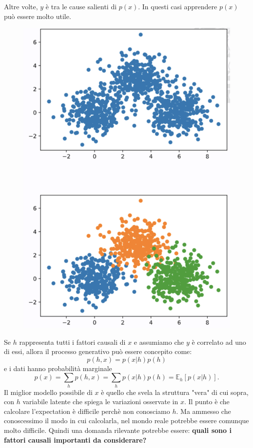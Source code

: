 Altre volte, $y$ è tra le cause salienti di $p(x)$. In questi casi apprendere $p(x)$ può essere molto utile.
\begin{figure}[!h]
  \includegraphics[scale=.3]{images/representation_learning/success.png}
  \centering
\end{figure}
\newpage
Se $h$ rappresenta tutti i fattori causali di $x$ e assumiamo che $y$ è correlato ad uno di essi, allora il
processo generativo può essere concepito come:
\begin{equation}
  p(h,x)=p(x|h)p(h)
\end{equation}
e i dati hanno probabilità marginale
\begin{equation}
  p(x)=\sum_hp(h,x)=\sum_hp(x|h)p(h)=\mathbb{E}_h[p(x|h)].
\end{equation}
Il miglior modello possibile di $x$ è quello che svela la struttura "vera" di cui sopra, con $h$ variabile
latente che spiega le variazioni osservate in $x$. Il punto è che calcolare l'expectation è difficile 
perchè non conosciamo $h$. Ma ammesso che conoscessimo il modo in cui calcolarla, nel mondo reale potrebbe 
essere comunque molto difficile. Quindi una domanda rilevante potrebbe essere: \textbf{quali sono i fattori 
causali importanti da considerare?} 
\newline
\newline
